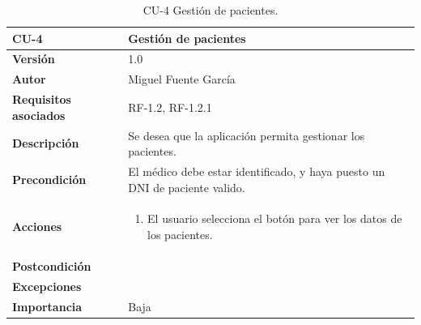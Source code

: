 \begin{table}[p]
	\centering
	\begin{tabularx}{\linewidth}{ p{} p{} }
		\toprule
		\textbf{CU-4}    & \textbf{Gestión de pacientes}\\
		\toprule
		\textbf{Versión}              & 1.0    \\
		\textbf{Autor}                & Miguel Fuente García \\
		\textbf{Requisitos asociados} & RF-1.2, RF-1.2.1  \\
  
		\textbf{Descripción}          & Se desea que la aplicación permita gestionar los pacientes. \\
		\textbf{Precondición}         & El médico debe estar identificado, y haya puesto un DNI de paciente valido. \\
		\textbf{Acciones}             &
		\begin{enumerate}
			\def\labelenumi{\arabic{enumi}.}
			\tightlist
			\item El usuario selecciona el botón para ver los datos de los pacientes.
		\end{enumerate}\\
		\textbf{Postcondición}        &  \\
		\textbf{Excepciones}          &  \\
		\textbf{Importancia}          & Baja  \\
		\bottomrule
	\end{tabularx}
	\caption{CU-4 Gestión de pacientes.}
\end{table}

